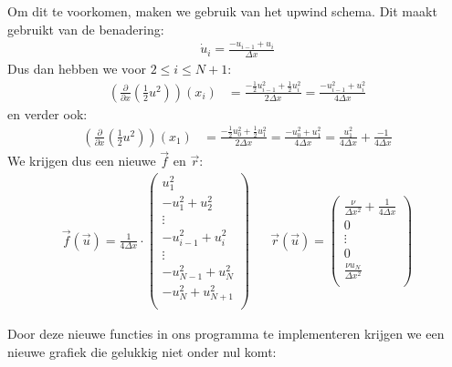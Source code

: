 \documentclass{article}
\begin{document}
Om dit te voorkomen, maken we gebruik van het upwind schema.
Dit maakt gebruikt van de benadering:
\begin{align*}
\dot{u}_{i} =\frac{-u_{i-1}+u_{i}}{\Delta x}
\end{align*}
Dus dan hebben we voor $2\leq i \leq N+1$:
\begin{align*}
\left(\frac{\partial}{\partial x}\left(\frac{1}{2}u^2\right)\right)(x_i) &= \frac{-\frac{1}{2}u_{i-1}^2+\frac{1}{2}u_{i}^2}{2\Delta x}
= \frac{-u_{i-1}^2+u_{i}^2}{4\Delta x}
\end{align*}
en verder ook:
\begin{align*}
\left(\frac{\partial}{\partial x}\left(\frac{1}{2}u^2\right)\right)(x_1) &= \frac{-\frac{1}{2}u_{0}^2+\frac{1}{2}u_{1}^2}{2\Delta x}
= \frac{-u_{0}^2+u_{1}^2}{4\Delta x}
=\frac{u_1^2}{4\Delta x} + \frac{-1}{4\Delta x}
\end{align*}
We krijgen dus een nieuwe $\vec{f}$ en $\vec{r}$:
\begin{align*}
\vec{f}(\vec{u}) =
\frac{1}{4\Delta x} \cdot
\begin{pmatrix}
u_1^2\\
-u_1^2 + u_2^2\\
\vdots\\
-u_{i-1}^2+u_{i}^2\\
\vdots\\
-u_{N-1}^2+u_{N}^2\\
-u_N^2+u_{N+1}^2\\
\end{pmatrix}
 &&
\vec{r}(\vec{u}) = 
\begin{pmatrix}
\frac{\nu}{\Delta x^2} + \frac{1}{4\Delta x}\\
0\\
\vdots\\
0\\
\frac{\nu u_N}{\Delta x^2}\\
\end{pmatrix}
\end{align*}

Door deze nieuwe functies in ons programma te implementeren krijgen we een nieuwe grafiek die gelukkig niet onder nul komt:
\end{document}
